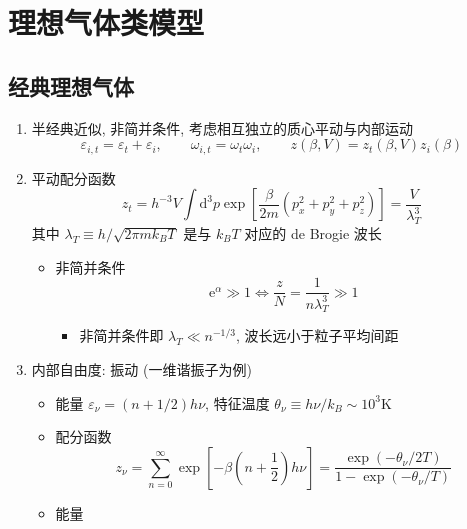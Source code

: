 \documentclass[12pt,a4paper]{article}%
\numberwithin{equation}{section}
\newcommand{\dif}{\mathrm{d}}
\newcommand\e{\mathrm{e}}%
\begin{document}
\section{理想气体类模型} %
\label{sec:ideal_gas_like_model}
\subsection{经典理想气体} %
\label{sub:ideal_gas}
\begin{enumerate}
    \item 半经典近似, 非简并条件, 考虑相互独立的质心平动与内部运动
    \begin{equation}
        \varepsilon_{i,t} = \varepsilon_t + \varepsilon_i, \qquad
        \omega_{i,t} = \omega_t\omega_i,\qquad
        z(\beta,V) = z_t(\beta, V)z_i(\beta)
    \end{equation}
    \item 平动配分函数
    \begin{equation}
        z_t = h^{-3} V\int\dif^3p\exp\left[\frac\beta{2m}(p_x^2+p_y^2+p_z^2)\right]
        =\frac{V}{\lambda_T^3}
    \end{equation}
    其中 $\lambda_T\equiv h/\sqrt{2\pi mk_BT}$ 是与 $k_BT$ 对应的 de Brogie 波长
    \begin{itemize}
        \item 非简并条件
        \begin{equation}
            \e^\alpha \gg 1 \Longleftrightarrow 
            \frac zN =  \frac 1{n\lambda_T^3} \gg 1
        \end{equation}
        \begin{itemize}
            \item 非简并条件即 $\lambda_T \ll n^{-1/3}$, 波长远小于粒子平均间距
        \end{itemize}
    \end{itemize}
    \item 内部自由度: 振动 (一维谐振子为例)
    \begin{itemize}
        \item 能量 $\varepsilon_\nu = \left(n+1/2\right)h\nu$, 
        特征温度 $\theta_\nu\equiv h\nu/k_B\sim 10^3\mathrm K$
        \item 配分函数
        \begin{equation}
            z_\nu = \sum_{n=0}^\infty\exp\left[-\beta\left(n+\frac12\right)h\nu\right]
            =\frac{\exp\left(-\theta_\nu/2T\right)}{1-\exp\left(-\theta_\nu/T\right)}
        \end{equation}
        \item 能量

\end{itemize}
\end{enumerate}
\end{document}
